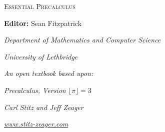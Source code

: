 
\hskip 125pt\begin{minipage}{\textwidth}
\begin{flushright}

\textsc{{\Huge Essential Precalculus}} \\

\bigskip



\bigskip

\Large
\vspace{1in}

\textbf{Editor:} Sean Fitzpatrick

\emph{\large Department of Mathematics and Computer Science}

\emph{\large University of Lethbridge}\vskip15pt

\parbox{200pt}{\textit{An open textbook based upon:}}\hskip 2cm \phantom{.}

\vspace{0.5in}

\textit{Precalculus, Version $\lfloor \pi\rfloor = 3$}

\emph{\large Carl Stitz and Jeff Zeager}

\emph{\large \href{http://www.stitz-zeager.com}{www.stitz-zeager.com}}\vskip 15pt



\normalsize
\end{flushright}
\end{minipage}


